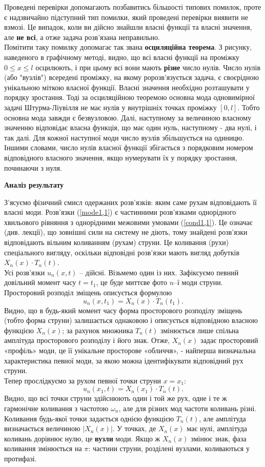 Проведені перевірки допомагають позбавитись більшості типових помилок, проте є надзвичайно підступний тип помилки, який проведені перевірки виявити не взмозі. Це випадок, коли ви дійсно знайшли власні функції та власні значення, але \textbf{не всі}, а отже задача розв'язана неправильно.\\
Помітити таку помилку допомагає так звана \textbf{осциляційна теорема}. З рисунку, наведеного в графічному методі, видно, що всі власні функції на проміжку $0 \leq x \leq l$ осцилюють, і при цьому всі вони мають \textbf{різне} число нулів. Число нулів (або "вузлів") всередені проміжку, на якому ророзв’язується задача, є своєрідною унікальною міткою власної функції. Власні значення необхідно розташувати у порядку зростання. Тоді за осциляційною теоремою основна мода одновимірної задачі Штурма-Ліувілля не має нулів у внутрішніх точках проміжку $[0, l]$. Тобто основна мода завжди є безвузловою. Далі, наступному за величиною власному значенню відповідає власна функція, що має один нуль, наступному - два нулі, і так далі. Для кожної наступної моди число вузлів збільшується на одиницю. Іншими словами, число нулів власної функції збігається з порядковим номером відповідного власного значення, якщо нумерувати їх у порядку зростання, починаючи з нуля.

\begin{center}
    \large{\textbf{Аналіз результату}}
\end{center}
З'ясуємо фізичний смисл одержаних розв'язків: яким саме рухам відповідають її власні моди. Розв’язки (\ref{mode1,1}) є частинними розв'язками однорідного хвильового рівняння з однорідними межовими умовами (\ref{cond1,1}). Це означає (див. лекції), що зовнішні сили на систему не діють, тому знайдені розв’язки відповідають вільним коливанням (рухам) струни. Це коливання (рухи) спеціального вигляду, оскільки відповідні розв’язки мають вигляд добутків $X_n(x) \cdot T_n(t)$.\\
Усі розв’язки $u_n(x, t)$ -- дійсні. Візьмемо один із них. Зафіксуємо певний довільний момент часу $t = t_1$, це буде миттєве фото $n$–ї моди струни. Просторовий розподіл зміщень описується формулою \[u_n(x, t_1) = X_n(x) \cdot T_n(t_1).\] Видно, що в будь-який момент часу форма просторового розподілу зміщень (тобто форма струни) залишається однаковою і описується відповідною власною функцією $X_n(x)$; за рахунок множника $T_n(t)$ змінюється лише спільна амплітуда просторового розподілу і його знак. Отже, $X_n(x)$ задає просторовий «профіль» моди, це її унікальне просторове «обличчя», - найперша визначальна характеристика певної моди, за якою можна ідентифікувати відповідний рух струни.\\
Тепер прослідкуємо за рухом певної точки струни $x = x_1$: \[u_n(x_1, t) = X_n(x_1) \cdot T_n(t).\] Видно, що всі точки струни здійснюють один і той же рух, одне і те ж гармонічне коливання з частотою $\omega_n$, але для різних мод частоти коливань різні. Коливання будь-якої точки задається однією функцією $T_n(t)$, але амплітуда визначається величиною $\left|X_n(x)\right|$. У точках, де $X_n(x)$ має нулі, амплітуда коливань дорівнює нулю, це \textbf{вузли} моди. Якщо ж $X_n(x)$ змінює знак, фаза коливання змінюється на $\pi$: частини струни, розділені вузлами, коливаються у протифазі.


